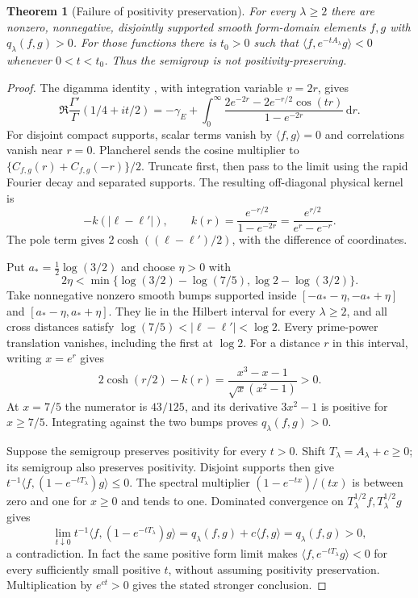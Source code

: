 \documentclass[11pt]{article}
\newtheorem{theorem}{Theorem}
\theoremstyle{remark}\newtheorem{remark}[theorem]{Remark}
\newcommand{\dd}{\,\mathrm d}
\begin{document}
\begin{theorem}[Failure of positivity preservation]\label{thm:semigroup}
For every $\lambda\ge2$ there are nonzero, nonnegative,
disjointly supported smooth form-domain elements $f,g$
with $q_\lambda(f,g)>0$. For those functions there is $t_0>0$
such that $\langle f,e^{-tA_\lambda}g\rangle<0$ whenever
$0<t<t_0$. Thus the semigroup is not positivity-preserving.
\end{theorem}
\begin{proof}
The digamma identity \cite[eq.~(5.9.16), $\Re z>0$]{DLMFGamma},
with integration variable $v=2r$, gives
\[
 \Re\frac{\Gamma'}{\Gamma}(1/4+it/2)
 =-\gamma_E+\int_0^\infty
 \frac{2e^{-2r}-2e^{-r/2}\cos(tr)}{1-e^{-2r}}\dd r.
\]
For disjoint compact supports, scalar terms vanish by
$\langle f,g\rangle=0$ and correlations vanish near $r=0$.
Plancherel sends the cosine multiplier to
$\{C_{f,g}(r)+C_{f,g}(-r)\}/2$.
Truncate first, then pass to the limit using the rapid
Fourier decay and separated supports. The resulting
off-diagonal physical kernel is
\[
 -k(|\ell-\ell'|),\qquad
 k(r)=\frac{e^{-r/2}}{1-e^{-2r}}
     =\frac{e^{r/2}}{e^r-e^{-r}}.
\]
The pole term gives $2\cosh((\ell-\ell')/2)$,
with the difference of coordinates.

Put $a_*=\tfrac12\log(3/2)$ and choose $\eta>0$ with
\[
 2\eta<\min\{\log(3/2)-\log(7/5),
                         \log2-\log(3/2)\}.
\]
Take nonnegative nonzero smooth bumps supported inside
$[-a_*-\eta,-a_*+\eta]$ and
$[a_*-\eta,a_*+\eta]$. They lie in the Hilbert interval
for every $\lambda\ge2$, and all cross distances satisfy
$\log(7/5)<|\ell-\ell'|<\log2$.
Every prime-power translation vanishes, including the
first at $\log2$. For a distance $r$ in this interval,
writing $x=e^r$ gives
\[
 2\cosh(r/2)-k(r)
 =\frac{x^3-x-1}{\sqrt x(x^2-1)}>0.
\]
At $x=7/5$ the numerator is $43/125$, and its derivative
$3x^2-1$ is positive for $x\ge7/5$.
Integrating against the two bumps proves $q_\lambda(f,g)>0$.

Suppose the semigroup preserves positivity for every $t>0$.
Shift $T_\lambda=A_\lambda+c\ge0$; its semigroup also
preserves positivity. Disjoint supports then give
$t^{-1}\langle f,(1-e^{-tT_\lambda})g\rangle\le0$.
The spectral multiplier $(1-e^{-tx})/(tx)$ is between
zero and one for $x\ge0$ and tends to one. Dominated
convergence on $T_\lambda^{1/2}f,T_\lambda^{1/2}g$ gives
\[
 \lim_{t\downarrow0}t^{-1}\langle
 f,(1-e^{-tT_\lambda})g\rangle
 =q_\lambda(f,g)+c\langle f,g\rangle=q_\lambda(f,g)>0,
\]
a contradiction.
In fact the same positive form limit makes
$\langle f,e^{-tT_\lambda}g\rangle<0$ for every sufficiently
small positive $t$, without assuming positivity preservation.
Multiplication by $e^{ct}>0$ gives the stated stronger conclusion.
\end{proof}
\end{document}
